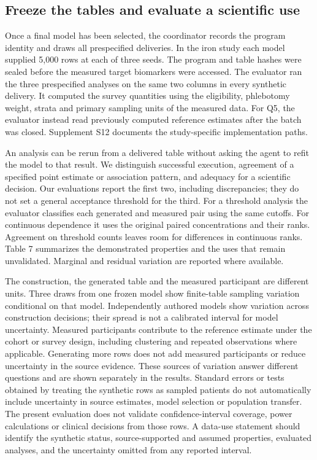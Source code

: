 \documentclass[11pt,letterpaper]{article}
\begin{document}
\subsection{Freeze the tables and evaluate a scientific use}

Once a final model has been selected, the coordinator records the program identity and draws all prespecified deliveries. In the iron study each model supplied 5,000 rows at each of three seeds. The program and table hashes were sealed before the measured target biomarkers were accessed. The evaluator ran the three prespecified analyses on the same two columns in every synthetic delivery. It computed the survey quantities using the eligibility, phlebotomy weight, strata and primary sampling units of the measured data. For Q5, the evaluator instead read previously computed reference estimates after the batch was closed. Supplement S12 documents the study-specific implementation paths.


An analysis can be rerun from a delivered table without asking the agent to refit the model to that result. We distinguish successful execution, agreement of a specified point estimate or association pattern, and adequacy for a scientific decision. Our evaluations report the first two, including discrepancies; they do not set a general acceptance threshold for the third. For a threshold analysis the evaluator classifies each generated and measured pair using the same cutoffs. For continuous dependence it uses the original paired concentrations and their ranks. Agreement on threshold counts leaves room for differences in continuous ranks. Table 7 summarizes the demonstrated properties and the uses that remain unvalidated. Marginal and residual variation are reported where available.


The construction, the generated table and the measured participant are different units. Three draws from one frozen model show finite-table sampling variation conditional on that model. Independently authored models show variation across construction decisions; their spread is not a calibrated interval for model uncertainty. Measured participants contribute to the reference estimate under the cohort or survey design, including clustering and repeated observations where applicable. Generating more rows does not add measured participants or reduce uncertainty in the source evidence. These sources of variation answer different questions and are shown separately in the results. Standard errors or tests obtained by treating the synthetic rows as sampled patients do not automatically include uncertainty in source estimates, model selection or population transfer. The present evaluation does not validate confidence-interval coverage, power calculations or clinical decisions from those rows. A data-use statement should identify the synthetic status, source-supported and assumed properties, evaluated analyses, and the uncertainty omitted from any reported interval.
\end{document}
